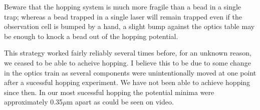 Beware that the hopping system is much more fragile than a bead in a single trap; whereas a bead trapped in a single laser will remain trapped even if the observation cell is bumped by a hand, a slight bump against the optics table may be enough to knock a bead out of the hopping potential.

This strategy worked fairly reliably several times before, for an unknown reason, we ceased to be able to acheive hopping. I believe this to be due to some change in the optics train as several components were unintentionally moved at one point after a sucessful hopping experiment. We have not been able to achieve hopping since then. In our most sucessful hopping the potential minima were approximately 0.35$\mu$m apart as could be seen on video.